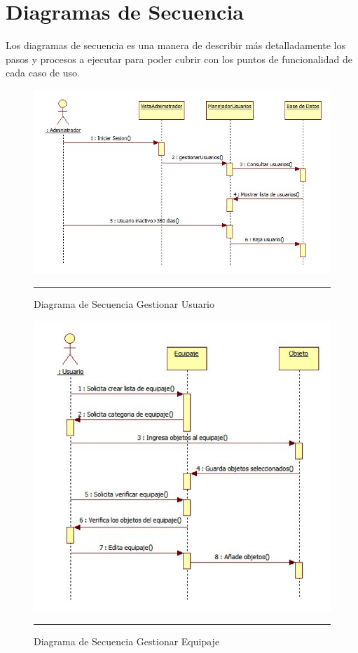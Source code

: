 \section{Diagramas de Secuencia}

Los diagramas de secuencia es una manera de describir más detalladamente los pasos y procesos a ejecutar para poder cubrir con los puntos de funcionalidad de cada caso de uso. 

\begin{figure}[h]
	\centering
		\includegraphics[width=1\textwidth]{Figuras/GestionarUsuario.jpg}
		\rule{30em}{1pt}
	\caption[Diagrama de Secuencia Gestionar Usuario]{Diagrama de Secuencia Gestionar Usuario}
	\label{fig:secGestionarUsuario}
\end{figure}

\begin{figure}[H]
	\centering
		\includegraphics[width=1\textwidth]{Figuras/secGestionarEquipaje.png}
		\rule{30em}{0.5pt}
	\caption[Diagrama de Secuencia Gestionar Equipaje]{Diagrama de Secuencia Gestionar Equipaje}
	\label{fig:secRegistrarEquipaje}
\end{figure}


